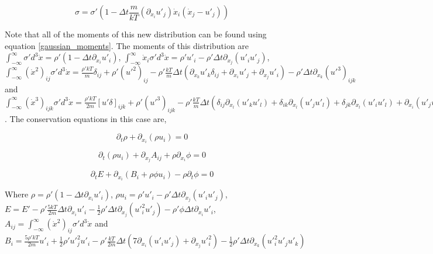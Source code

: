 \documentclass[%
 twocolumn,
 amsmath,amssymb,
 aps,
]{revtex4-1}
\newcommand{\intVdot}[1]{\int_{-\infty}^{\infty} #1 d^3\dot{x}}
\begin{document}
\begin{equation}
\sigma = \sigma'\left(1-\Delta t\frac{m}{kT}\left(\partial_{x_i}u'_j\right)\dot{x}_i\left(\dot{x}_j-u'_j\right)\right)
\end{equation}

Note that all of the moments of this new distribution can be found using equation \eqref{gaussian_moments}. The moments of this distribution are $\intVdot{\sigma'}=\rho'\left(1-\Delta t\partial_{x_i}u'_i\right)$, $\intVdot{\dot{x}_i\sigma'}=\rho' u'_i-\rho'\Delta t\partial_{x_j}\left(u'_iu'_j\right)$, $\intVdot{\left(\dot{x}^2\right)_{ij}\sigma'}=\frac{\rho'kT}{m}\delta_{ij} + \rho'\left({u'}^2\right)_{ij}-\rho'\frac{kT}{m}\Delta t\left(\partial_{x_k}u'_k\delta_{ij} + \partial_{x_i}u'_j + \partial_{x_j}u'_i\right)-\rho'\Delta t\partial_{x_k}\left({u'}^3\right)_{ijk}$ and $\intVdot{\left(\dot{x}^3\right)_{ijk}\sigma'}=\frac{\rho'kT}{2m}\left[u'\delta\right]_{ijk} + \rho'\left(u'^3\right)_{ijk}-\rho'\frac{kT}{m}\Delta t\left(\delta_{ij}\partial_{x_l}\left(u'_ku'_l\right)+\delta_{ik}\partial_{x_l}\left(u'_ju'_l\right) + \delta_{jk}\partial_{x_l}\left(u'_iu'_l\right) + \partial_{x_i}\left(u'_ju'_k\right) + \partial_{x_j}\left(u'_iu'_k\right) + \partial_{x_k}\left(u'_iu'_j\right)\right)-\rho'\Delta t\partial_{x_l}\left({u'}^4\right)_{ijkl}$. The conservation equations in this case are,

\[
\partial_t \rho + \partial_{x_i}\left(\rho u_i\right)=0
\]

\[
\partial_t \left(\rho u_i\right) + \partial_{x_j}A_{ij} + \rho\partial_{x_i}\phi = 0
\]

\[
\partial_t E + \partial_{x_i}\left(B_i + \rho\phi u_i\right)-\rho\partial_t\phi = 0
\]

Where $\rho=\rho'\left(1-\Delta t\partial_{x_i}u'_i\right)$, $\rho u_i=\rho' u'_i-\rho'\Delta t\partial_{x_j}\left(u'_iu'_j\right)$, $E=E'-\rho'\frac{5kT}{2m}\Delta t\partial_{x_i}u'_i-\frac{1}{2}\rho'\Delta t\partial_{x_j}\left({u'}_i^2u'_j\right)-\rho'\phi\Delta t\partial_{x_i}u'_i$, $A_{ij}=\intVdot{\left(\dot{x}^2\right)_{ij}\sigma'}$ and $B_i=\frac{5\rho'kT}{2m}u'_i + \frac{1}{2}\rho'{u'}_j^2u'_i-\rho'\frac{kT}{2m}\Delta t\left(7\partial_{x_i}\left(u'_iu'_j\right) + \partial_{x_j}{u'}_i^2\right)-\frac{1}{2}\rho'\Delta t\partial_{x_k}\left({u'}_i^2u'_ju'_k\right)$
\end{document}
